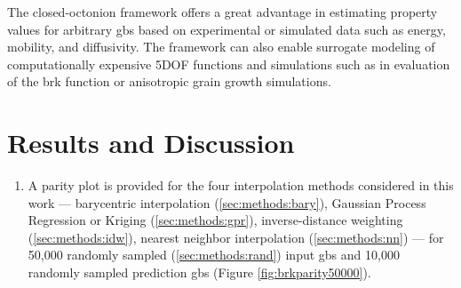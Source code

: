 \documentclass[preprint,12pt]{elsarticle}
\begin{document}
The closed-octonion framework offers a great advantage in estimating property values for arbitrary \glspl{gb} based on experimental or simulated data such as energy, mobility, and diffusivity. The framework can also enable surrogate modeling of computationally expensive 5DOF functions and simulations such as in evaluation of the \gls{brk} function or anisotropic grain growth simulations.

\section{Results and Discussion} \label{sec:resultsDiscussion}

\begin{enumerate}

    \item A parity plot is provided for the four interpolation methods considered in this work --- barycentric interpolation (\ref{sec:methods:bary}), Gaussian Process Regression or Kriging (\ref{sec:methods:gpr}), inverse-distance weighting (\ref{sec:methods:idw}), nearest neighbor interpolation (\ref{sec:methods:nn}) --- for 50,000 randomly sampled (\ref{sec:methods:rand}) input \glspl{gb} and 10,000 randomly sampled prediction \glspl{gb} (Figure \ref{fig:brkparity50000}).


\end{enumerate}
\end{document}
